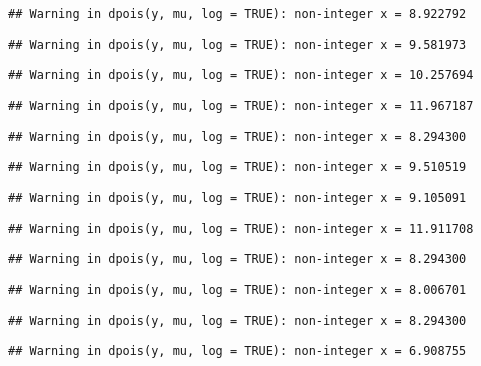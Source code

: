 \documentclass[
]{article}
\begin{document}
\begin{verbatim}
## Warning in dpois(y, mu, log = TRUE): non-integer x = 8.922792
\end{verbatim}

\begin{verbatim}
## Warning in dpois(y, mu, log = TRUE): non-integer x = 9.581973
\end{verbatim}

\begin{verbatim}
## Warning in dpois(y, mu, log = TRUE): non-integer x = 10.257694
\end{verbatim}

\begin{verbatim}
## Warning in dpois(y, mu, log = TRUE): non-integer x = 11.967187
\end{verbatim}

\begin{verbatim}
## Warning in dpois(y, mu, log = TRUE): non-integer x = 8.294300
\end{verbatim}

\begin{verbatim}
## Warning in dpois(y, mu, log = TRUE): non-integer x = 9.510519
\end{verbatim}

\begin{verbatim}
## Warning in dpois(y, mu, log = TRUE): non-integer x = 9.105091
\end{verbatim}

\begin{verbatim}
## Warning in dpois(y, mu, log = TRUE): non-integer x = 11.911708
\end{verbatim}

\begin{verbatim}
## Warning in dpois(y, mu, log = TRUE): non-integer x = 8.294300
\end{verbatim}

\begin{verbatim}
## Warning in dpois(y, mu, log = TRUE): non-integer x = 8.006701
\end{verbatim}

\begin{verbatim}
## Warning in dpois(y, mu, log = TRUE): non-integer x = 8.294300
\end{verbatim}

\begin{verbatim}
## Warning in dpois(y, mu, log = TRUE): non-integer x = 6.908755
\end{verbatim}
\end{document}
